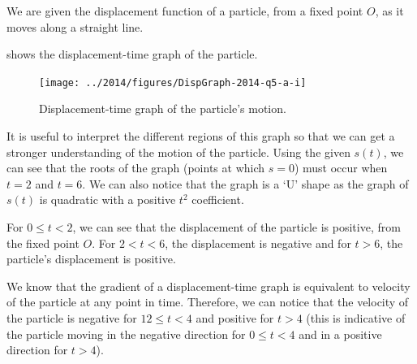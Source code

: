 %
%
%

	
\begin{subquestions}
	
	\subquestion
	
	We are given the displacement function of a particle, from a fixed point $O$, as it moves along a straight line.
	
	\begin{subsubquestions}
		
		\subsubquestion
		
		 shows the displacement-time graph of the particle.
		\begin{figure}[H]
			\begin{center}
				\texttt{[image: ../2014/figures/DispGraph-2014-q5-a-i]}
				\caption{\label{2014:q5*:SGraph1} Displacement-time graph of the particle's motion.}
			\end{center}
		\end{figure}
		
		It is useful to interpret the different regions of this graph so that we can get a stronger understanding of the motion of the particle. Using the given $s(t)$, we can see that the roots of the graph (points at which $s=0$) must occur when $t=2$ and $t=6$. We can also notice that the graph is a `U' shape as the graph of $s(t)$ is quadratic with a positive $t^2$ coefficient. 
		
		For $0 \leq t < 2$, we can see that the displacement of the particle is positive, from the fixed point $O$. For $2 < t < 6$, the displacement is negative and for $t>6$, the particle's displacement is positive. 
		
		We know that the gradient of a displacement-time graph is equivalent to velocity of the particle at any point in time. Therefore, we can notice that the velocity of the particle is negative for $12 \leq t < 4$ and positive for $t>4$ (this is indicative of the particle moving in the negative direction for $0 \leq t < 4$ and in a positive direction for $t>4$). 
		

\end{subsubquestions}
\end{subquestions}
